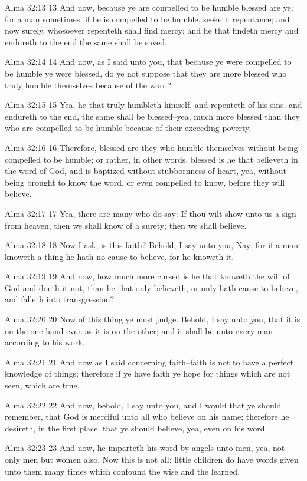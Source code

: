 Alma 32:13
 13 And now, because ye are compelled to be humble blessed are
ye; for a man sometimes, if he is compelled to be humble, seeketh
repentance; and now surely, whosoever repenteth shall find mercy;
and he that findeth mercy and endureth to the end the same shall
be saved.

Alma 32:14
 14 And now, as I said unto you, that because ye were compelled
to be humble ye were blessed, do ye not suppose that they are
more blessed who truly humble themselves because of the word?

Alma 32:15
 15 Yea, he that truly humbleth himself, and repenteth of his
sins, and endureth to the end, the same shall be blessed--yea,
much more blessed than they who are compelled to be humble
because of their exceeding poverty.

Alma 32:16
 16 Therefore, blessed are they who humble themselves without
being compelled to be humble; or rather, in other words, blessed
is he that believeth in the word of God, and is baptized without
stubbornness of heart, yea, without being brought to know the
word, or even compelled to know, before they will believe.

Alma 32:17
 17 Yea, there are many who do say: If thou wilt show unto us a
sign from heaven, then we shall know of a surety; then we shall
believe.

Alma 32:18
 18 Now I ask, is this faith? Behold, I say unto you, Nay; for
if a man knoweth a thing he hath no cause to believe, for he
knoweth it.

Alma 32:19
 19 And now, how much more cursed is he that knoweth the will of
God and doeth it not, than he that only believeth, or only hath
cause to believe, and falleth into transgression?

Alma 32:20
 20 Now of this thing ye must judge. Behold, I say unto you,
that it is on the one hand even as it is on the other; and it
shall be unto every man according to his work.

Alma 32:21
 21 And now as I said concerning faith--faith is not to have a
perfect knowledge of things; therefore if ye have faith ye hope
for things which are not seen, which are true.

Alma 32:22
 22 And now, behold, I say unto you, and I would that ye should
remember, that God is merciful unto all who believe on his name;
therefore he desireth, in the first place, that ye should
believe, yea, even on his word.

Alma 32:23
 23 And now, he imparteth his word by angels unto men, yea, not
only men but women also. Now this is not all; little children do
have words given unto them many times which confound the wise and
the learned.

